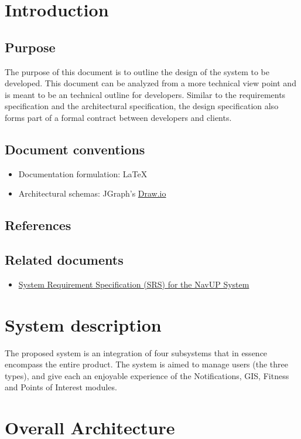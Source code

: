 \documentclass{article}
\begin{document}
\tableofcontents{}	

	\newpage
	\section{Introduction}
		\subsection{Purpose}
		The purpose of this document is to outline the design of the system to be developed. This document can be analyzed from a more technical view point and is meant to be an technical outline for developers.  Similar to the requirements specification and the architectural specification, the design specification also forms part of a formal contract between developers and clients.
		\subsection{Document conventions}
			\begin{itemize}
				\item Documentation formulation:  LaTeX
				\item Architectural schemas: JGraph's \href{https://www.draw.io/}{Draw.io}
			\end{itemize}
		\subsection{References}
		\subsection{Related documents}
			\begin{itemize}
				\item \href{http://www.cs.up.ac.za/files/COS301/Download/1528/}{System Requirement Specification (SRS) for the NavUP System}
			\end{itemize}
	\section{System description}

	The proposed system is an integration of four subsystems that in essence encompass the entire product. The system is aimed to manage users (the three types), and give each an enjoyable experience of the Notifications, GIS, Fitness and Points of Interest modules.  
	
	\section{Overall Architecture}
\end{document}
